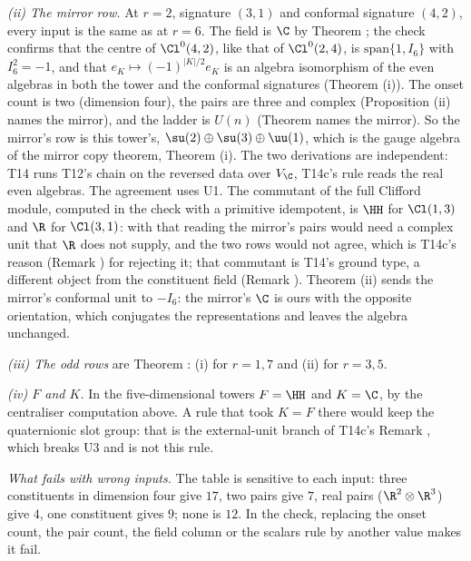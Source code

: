 \emph{(ii) The mirror row.}  At $r = 2$, signature $(3,1)$ and conformal signature $(4,2)$, every input is the same as at $r = 6$. The field is $\C$ by Theorem ; the check confirms that the centre of $\Cl^{0}(4,2)$, like that of $\Cl^{0}(2,4)$, is $\mathrm{span}\{1, I_{6}\}$ with $I_{6}^{2} = -1$, and that $e_{K} \mapsto (-1)^{|K|/2}e_{K}$ is an algebra isomorphism of the even algebras in both the tower and the conformal signatures (Theorem (i)). The onset count is two (dimension four), the pairs are three and complex (Proposition (ii) names the mirror), and the ladder is $U(n)$ (Theorem  names the mirror). So the mirror's row is this tower's, $\su(2) \oplus \su(3) \oplus \uu(1)$, which is the gauge algebra of the mirror copy theorem, Theorem (i). The two derivations are independent: T14 runs T12's chain on the reversed data over $V_{\C}$, T14c's rule reads the real even algebras. The agreement uses U1. The commutant of the full Clifford module, computed in the check with a primitive idempotent, is $\HH$ for $\Cl(1,3)$ and $\R$ for $\Cl(3,1)$: with that reading the mirror's pairs would need a complex unit that $\R$ does not supply, and the two rows would not agree, which is T14c's reason (Remark ) for rejecting it; that commutant is T14's ground type, a different object from the constituent field (Remark ). Theorem (ii) sends the mirror's conformal unit to $-I_{6}$: the mirror's $\C$ is ours with the opposite orientation, which conjugates the representations and leaves the algebra unchanged.

\emph{(iii) The odd rows}  are Theorem : (i) for $r = 1, 7$ and (ii) for $r = 3, 5$.

\emph{(iv) $F$ and $K$.}  In the five-dimensional towers $F = \HH$ and $K = \C$, by the centraliser computation above. A rule that took $K = F$ there would keep the quaternionic slot group: that is the external-unit branch of T14c's Remark , which breaks U3 and is not this rule.

\emph{What fails with wrong inputs.}  The table is sensitive to each input: three constituents in dimension four give $17$, two pairs give $7$, real pairs ($\R^{2} \otimes \R^{3}$) give $4$, one constituent gives $9$; none is $12$. In the check, replacing the onset count, the pair count, the field column or the scalars rule by another value makes it fail.
